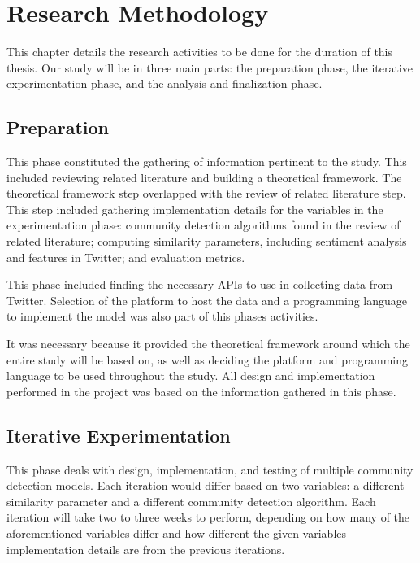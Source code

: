 \section{Research Methodology}
This chapter details the research activities to be done for the duration of this thesis. Our study will be in three main parts: the preparation phase, the iterative experimentation phase, and the analysis and finalization phase.




\subsection{Preparation}




This phase constituted the gathering of information pertinent to the study. This included reviewing related literature and building a theoretical framework. The theoretical framework step overlapped with the review of related literature step. This step included gathering implementation details for the variables in the experimentation phase: community detection algorithms found in the review of related literature; computing similarity parameters, including sentiment analysis and features in Twitter; and evaluation metrics. 




This phase included finding the necessary API\vtick s to use in collecting data from Twitter. Selection of the platform to host the data and a programming language to implement the model was also part of this phase\vtick s activities. 




It was necessary because it provided the theoretical framework around which the entire study will be based on, as well as deciding the platform and programming language to be used throughout the study. All design and implementation performed in the project was based on the information gathered in this phase.




\subsection{Iterative Experimentation}




This phase deals with design, implementation, and testing of multiple community detection models. Each iteration would differ based on two variables: a different similarity parameter and a different community detection algorithm. Each iteration will take two to three weeks to perform, depending on how many of the aforementioned variables differ and how different the given variable\vtick s implementation details are from the previous iteration\vtick s.




